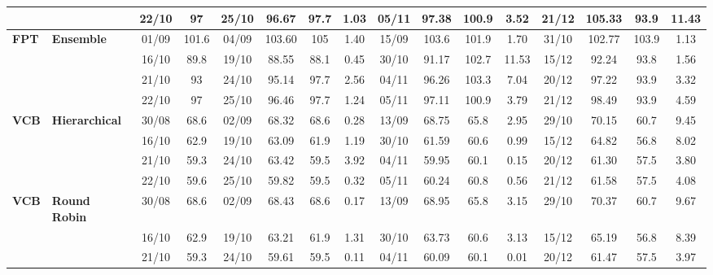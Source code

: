 \begin{table}[!h]
\begin{tabular}{llcc|cccc|cccc|cccc}
&
& 22/10 & 97 & 25/10 & 96.67 & 97.7 & 1.03 & 05/11 & 97.38 & 100.9 & 3.52 & 21/12 & 105.33 & 93.9 & 11.43 \\
\midrule



\multirow{4}{*}{\textbf{FPT}} 
& \textbf{Ensemble}
& 01/09 & 101.6 & 04/09 & 103.60 & 105 & 1.40 & 15/09 & 103.6 & 101.9 & 1.70 & 31/10 & 102.77 & 103.9 & 1.13 \\

&
& 16/10 & 89.8 & 19/10 & 88.55 & 88.1 & 0.45 & 30/10 & 91.17 & 102.7 & 11.53 & 15/12 & 92.24 & 93.8 & 1.56 \\

&
& 21/10 & 93 & 24/10 & 95.14 & 97.7 & 2.56 & 04/11 & 96.26 & 103.3 & 7.04 & 20/12 & 97.22 & 93.9 & 3.32 \\

&
& 22/10 & 97 & 25/10 & 96.46 & 97.7 & 1.24 & 05/11 & 97.11 & 100.9 & 3.79 & 21/12 & 98.49 & 93.9 & 4.59 \\
\midrule




\multirow{4}{*}{\textbf{VCB}} 
& \textbf{Hierarchical}
& 30/08 & 68.6 & 02/09 & 68.32 & 68.6 & 0.28 & 13/09 & 68.75 & 65.8 & 2.95 & 29/10 & 70.15 & 60.7 & 9.45 \\

&
& 16/10 & 62.9 & 19/10 & 63.09 & 61.9 & 1.19 & 30/10 & 61.59 & 60.6 & 0.99 & 15/12 & 64.82 & 56.8 & 8.02 \\

&
& 21/10 & 59.3 & 24/10 & 63.42 & 59.5 & 3.92 & 04/11 & 59.95 & 60.1 & 0.15 & 20/12 & 61.30 & 57.5 & 3.80 \\

&
& 22/10 & 59.6 & 25/10 & 59.82 & 59.5 & 0.32 & 05/11 & 60.24 & 60.8 & 0.56 & 21/12 & 61.58 & 57.5 & 4.08 \\
\midrule


\multirow{4}{*}{\textbf{VCB}} 
& \textbf{Round Robin}
& 30/08 & 68.6 & 02/09 & 68.43 & 68.6 & 0.17 & 13/09 & 68.95 & 65.8 & 3.15 & 29/10 & 70.37 & 60.7 & 9.67 \\

&
& 16/10 & 62.9 & 19/10 & 63.21 & 61.9 & 1.31 & 30/10 & 63.73 & 60.6 & 3.13 & 15/12 & 65.19 & 56.8 & 8.39 \\

&
& 21/10 & 59.3 & 24/10 & 59.61 & 59.5 & 0.11 & 04/11 & 60.09 & 60.1 & 0.01 & 20/12 & 61.47 & 57.5 & 3.97 \\


\end{tabular}
\end{table}
